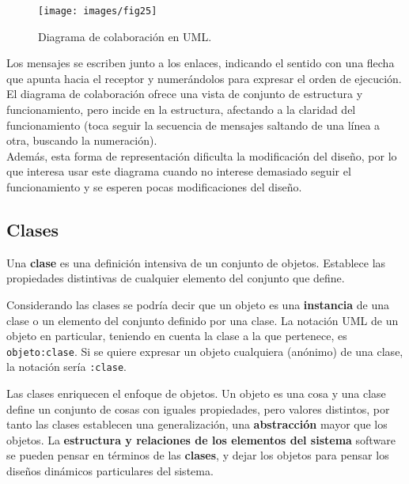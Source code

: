 \begin{figure}[ht!]  \centering
  \texttt{[image: images/fig25]}
  \caption{Diagrama de colaboración en UML.}
  \label{fig:25}
\end{figure}

Los mensajes se escriben junto a los enlaces, indicando el sentido con
una flecha que apunta hacia el receptor y numerándolos para expresar
el orden de ejecución. \\
El diagrama de colaboración ofrece una vista de conjunto de estructura
y funcionamiento, pero incide en la estructura, afectando a la
claridad del funcionamiento (toca seguir la secuencia de mensajes
saltando de una línea a otra, buscando la numeración).\\
Además, esta forma de representación dificulta la modificación del
diseño, por lo que interesa usar este diagrama cuando no interese
demasiado seguir el funcionamiento y se esperen pocas modificaciones
del diseño.

\subsection{Clases}
Una \textbf{clase} es una definición intensiva de un conjunto de
objetos. Establece las propiedades distintivas de cualquier elemento
del conjunto que define.\\

\vspace{5mm}

Considerando las clases se podría decir que un objeto es una
\textbf{instancia} de una clase o un elemento del conjunto definido
por una clase. La notación UML de un objeto en particular, teniendo en
cuenta la clase a la que pertenece, es \texttt{objeto:clase}. Si se
quiere expresar un objeto cualquiera (anónimo) de una clase, la
notación sería \texttt{:clase}.

\vspace{5mm}

Las clases enriquecen el enfoque de objetos. Un objeto es una cosa y
una clase define un conjunto de cosas con iguales propiedades, pero
valores distintos, por tanto las clases establecen una generalización,
una \textbf{abstracción} mayor que los objetos. La \textbf{estructura y
  relaciones de los elementos del sistema} software se pueden pensar en
términos de las \textbf{clases}, y dejar los objetos para pensar los diseños
dinámicos particulares del sistema.

\vspace{5mm}

